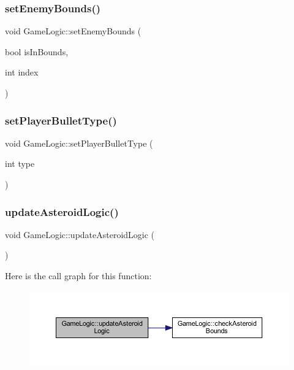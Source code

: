 \subsubsection{\texorpdfstring{set\+Enemy\+Bounds()}{setEnemyBounds()}}
{\footnotesize\ttfamily void Game\+Logic\+::set\+Enemy\+Bounds (\begin{DoxyParamCaption}\item[{bool}]{is\+In\+Bounds,  }\item[{int}]{index }\end{DoxyParamCaption})}

\mbox{\label{class_game_logic_a8463ab82ec024ace6457030f61430fc1}} 
\subsubsection{\texorpdfstring{set\+Player\+Bullet\+Type()}{setPlayerBulletType()}}
{\footnotesize\ttfamily void Game\+Logic\+::set\+Player\+Bullet\+Type (\begin{DoxyParamCaption}\item[{int}]{type }\end{DoxyParamCaption})}

\mbox{\label{class_game_logic_aefda6025dfef46818697b11f4276dfa6}} 
\subsubsection{\texorpdfstring{update\+Asteroid\+Logic()}{updateAsteroidLogic()}}
{\footnotesize\ttfamily void Game\+Logic\+::update\+Asteroid\+Logic (\begin{DoxyParamCaption}{ }\end{DoxyParamCaption})}

Here is the call graph for this function\+:\nopagebreak
\begin{figure}[H]
\begin{center}
\leavevmode
\includegraphics[width=350pt]{class_game_logic_aefda6025dfef46818697b11f4276dfa6_cgraph}
\end{center}
\end{figure}
\mbox{\label{class_game_logic_a07cb8f8cb380fa2cd070aa30148a8ffd}} 
